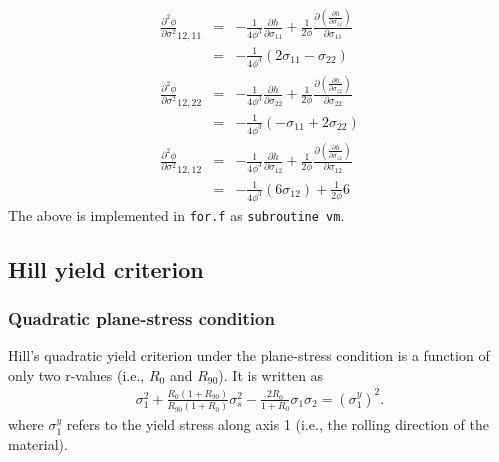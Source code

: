 \documentclass[12pt]{amsart}
\begin{document}
\begin{eqnarray}
  \frac{\partial^2\phi}{\partial\sigma^2}_{12,11}&=& - \frac{1}{4\phi^3} \frac{\partial h}{\partial\sigma_{11}}  + \frac{1}{2\phi}  \frac{\partial(  \frac{\partial h}{\partial \sigma_{12}}   )}{\partial\sigma_{11}} \\
                                                &=& - \frac{1}{4\phi^3} (2\sigma_{11}-\sigma_{22})  \nonumber\\
  \frac{\partial^2\phi}{\partial\sigma^2}_{12,22}&=& - \frac{1}{4\phi^3} \frac{\partial h}{\partial\sigma_{22}}  + \frac{1}{2\phi}  \frac{\partial(  \frac{\partial h}{\partial \sigma_{12}}   )}{\partial\sigma_{22}} \\
                                                &=& - \frac{1}{4\phi^3} (-\sigma_{11}+2\sigma_{22}) \nonumber\\
  \frac{\partial^2\phi}{\partial\sigma^2}_{12,12}&=& - \frac{1}{4\phi^3} \frac{\partial h}{\partial\sigma_{12}}  + \frac{1}{2\phi}  \frac{\partial(  \frac{\partial h}{\partial \sigma_{12}}   )}{\partial\sigma_{12}} \\
                                                &=& - \frac{1}{4\phi^3} (6\sigma_{12})                          + \frac{1}{2\phi}  6 \nonumber
\end{eqnarray}
The above is implemented in \verb|for.f| as \verb|subroutine vm|.


\subsection{Hill yield criterion}
\subsubsection{Quadratic plane-stress condition}
Hill's quadratic yield criterion under the plane-stress condition is a function of only two r-values (i.e., $R_0$ and $R_{90}$).
It is written as
\begin{eqnarray}
  \label{eq:hillquad}
  \sigma_{1}^2 + \frac{R_0 (1 + R_{90})}{R_{90}(1+R_0)}\sigma_s^2-\frac{2R_0}{1+R_0}\sigma_1\sigma_2=(\sigma_1^y)^2.
\end{eqnarray}
where $\sigma^y_1$ refers to the yield stress along axis 1 (i.e., the rolling direction of the material).
\end{document}
